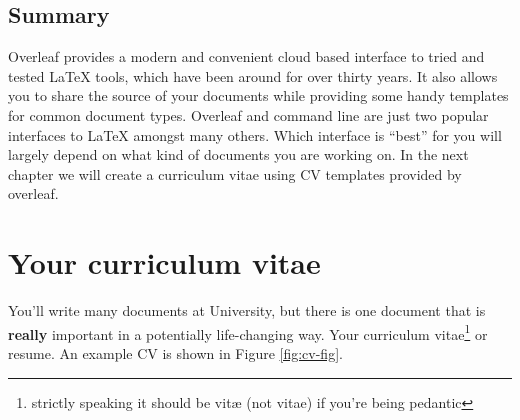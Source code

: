 \documentclass[
]{book}
\begin{document}
\hypertarget{overleafconc}{%
\section{Summary}\label{overleafconc}}

Overleaf provides a modern and convenient cloud based interface to tried and tested LaTeX tools, which have been around for over thirty years. \citep{knuth} It also allows you to share the source of your documents while providing some handy templates for common document types. Overleaf and command line are just two popular interfaces to LaTeX amongst many others. \citep{latexproject} Which interface is ``best'' for you will largely depend on what kind of documents you are working on. In the next chapter we will create a curriculum vitae using CV templates provided by overleaf.

\hypertarget{cv}{%
\chapter{Your curriculum vitae}\label{cv}}

You'll write many documents at University, but there is one document that is \textbf{really} important in a potentially life-changing way. Your curriculum vitae\footnote{strictly speaking it should be vitæ (not vitae) if you're being pedantic} or resume. An example CV is shown in Figure \ref{fig:cv-fig}.
\end{document}
